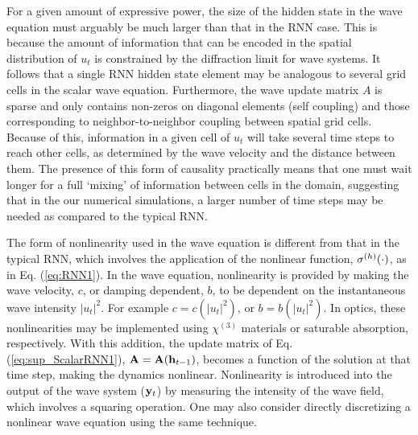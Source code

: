 For a given amount of expressive power, the size of the hidden state in the wave equation must arguably be much larger than that in the RNN case.  This is because the amount of information that can be encoded in the spatial distribution of $u_t$ is constrained by the diffraction limit for wave systems.  It follows that a single RNN hidden state element may be analogous to several grid cells in the scalar wave equation. Furthermore, the wave update matrix $A$ is sparse and only contains non-zeros on diagonal elements (self coupling) and those corresponding to neighbor-to-neighbor coupling between spatial grid cells.  Because of this, information in a given cell of $u_t$ will take several time steps to reach other cells, as determined by the wave velocity and the distance between them.  The presence of this form of causality practically means that one must wait longer for a full `mixing' of information between cells in the domain, suggesting that in the our numerical simulations, a larger number of time steps may be needed as compared to the typical RNN. 


The form of nonlinearity used in the wave equation is different from that in the typical RNN, which involves the application of the nonlinear function, $\sigma^{(h)}(\cdot)$, as in Eq. (\ref{eq:RNN1}).  In the wave equation, nonlinearity is provided by making the wave velocity, $c$, or damping dependent, $b$, to be dependent on the instantaneous wave intensity $|u_t|^2$.  For example $c = c(|u_t|^2)$, or $b = b(|u_t|^2)$.  In optics, these nonlinearities may be implemented using $\chi^{(3)}$ materials or saturable absorption, respectively.  With this addition, the update matrix of Eq. (\ref{eq:sup_ScalarRNN1}), $\mathbf{A} = \mathbf{A}(\mathbf{h}_{t-1})$, becomes a function of the solution at that time step, making the dynamics nonlinear.  Nonlinearity is introduced into the  output of the wave system ($\mathbf{y}_t$) by measuring the intensity of the wave field, which involves a squaring operation.  One may also consider directly discretizing a nonlinear wave equation using the same technique.

